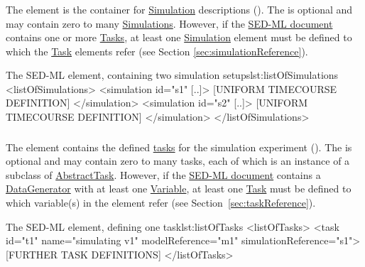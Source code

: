 \subsubsection{}
\label{sec:listOfSimulations}
The  element is the container for \hyperref[class:simulation]{Simulation} descriptions (). The  is optional and may contain zero to many \hyperref[class:simulation]{Simulations}. However, if the \hyperref[class:sed-ml]{SED-ML document} contains one or more \hyperref[class:abstractTask]{Tasks}, at least one \hyperref[class:simulation]{Simulation} element must be defined to which the \hyperref[class:abstractTask]{Task} elements refer (see Section \ref{sec:simulationReference}).

\begin{myXmlLst}{The SED-ML  element, containing two simulation setups}{lst:listOfSimulations}
<listOfSimulations>
	<simulation id="s1" [..]>
		[UNIFORM TIMECOURSE DEFINITION]
	</simulation>
	<simulation id="s2" [..]>
   		[UNIFORM TIMECOURSE DEFINITION]
	</simulation>
</listOfSimulations>
\end{myXmlLst}
 
\subsubsection{}
\label{sec:listOfTasks}
The  element contains the defined \hyperref[class:task]{tasks} for the simulation experiment (). The  is optional and may contain zero to many tasks, each of which is an instance of a subclass of \hyperref[class:abstractTask]{AbstractTask}. However, if the \hyperref[class:sed-ml]{SED-ML document} contains a \hyperref[class:dataGenerator]{DataGenerator} with at least one \hyperref[class:variable]{Variable}, at least one \hyperref[class:abstractTask]{Task} must be defined to which variable(s) in the \hyperref[class:dataGenerator]{} element refer (see Section~\ref{sec:taskReference}).

\begin{myXmlLst}{The SED-ML  element, defining one task}{lst:listOfTasks}
<listOfTasks>
	<task id="t1" name="simulating v1" modelReference="m1" simulationReference="s1">
	[FURTHER TASK DEFINITIONS]
</listOfTasks>
\end{myXmlLst}


